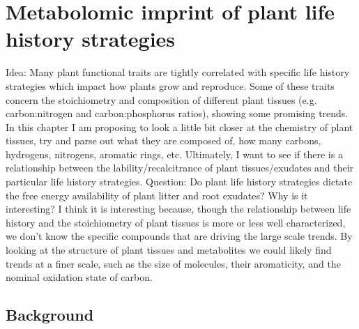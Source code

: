 \chapter{Metabolomic imprint of plant life history strategies}


Idea: Many plant functional traits are tightly correlated with specific life history strategies which impact how plants grow and reproduce. Some of these traits concern the stoichiometry and composition of different plant tissues (e.g. carbon:nitrogen and carbon:phosphorus ratios), showing some promising trends. In this chapter I am proposing to look a little bit closer at the chemistry of plant tissues, try and parse out what they are composed of, how many carbons, hydrogens, nitrogens, aromatic rings, etc. Ultimately, I want to see if there is a relationship between the lability/recalcitrance of plant tissues/exudates and their particular life history strategies.
Question: Do plant life history strategies dictate the free energy availability of plant litter and root exudates?
Why is it interesting? I think it is interesting because, though the relationship between life history and the stoichiometry of plant tissues is more or less well characterized, we don’t know the specific compounds that are driving the large scale trends. By looking at the structure of plant tissues and metabolites we could likely find trends at a finer scale, such as the size of molecules, their aromaticity, and the nominal oxidation state of carbon.

\section{Background}



